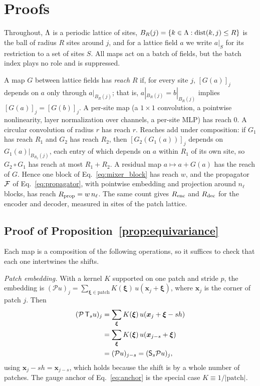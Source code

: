 \section{Proofs}
\label{app:proofs}

Throughout, $\Lambda$ is a periodic lattice of sites, $B_R(j)=\{k\in\Lambda:
\operatorname{dist}(k,j)\le R\}$ is the ball of radius $R$ sites around $j$, and for a
lattice field $a$ we write $a|_S$ for its restriction to a set of sites
$S$. All maps act on a batch of fields, but the batch index plays no role
and is suppressed.

A map $G$ between lattice fields has \emph{reach} $R$ if, for every site
$j$, $[G(a)]_j$ depends on $a$ only through $a|_{B_R(j)}$; that is,
$a|_{B_R(j)}=b|_{B_R(j)}$ implies $[G(a)]_j=[G(b)]_j$. A per-site map
(a $1\times1$ convolution, a pointwise nonlinearity, layer normalization
over channels, a per-site MLP) has reach $0$. A circular convolution of
radius $r$ has reach $r$. Reaches add under composition: if $G_1$ has
reach $R_1$ and $G_2$ has reach $R_2$, then $[G_2(G_1(a))]_j$ depends on
$G_1(a)|_{B_{R_2}(j)}$, each entry of which depends on $a$ within $R_1$
of its own site, so $G_2\circ G_1$ has reach at most $R_1+R_2$. A residual
map $a\mapsto a+G(a)$ has the reach of $G$. Hence one block of
Eq.~\eqref{eq:mixer_block} has reach $w$, and the propagator $\mathcal{F}$ of
Eq.~\eqref{eq:propagator}, with pointwise embedding and projection around
$n_\ell$ blocks, has reach $R_{\mathrm{prop}} = w\,n_\ell$. The same count gives
$R_{\mathrm{enc}}$ and $R_{\mathrm{dec}}$ for the encoder and decoder, measured in sites of
the patch lattice.

\subsection{Proof of Proposition~\ref{prop:equivariance}}

Each map is a composition of the following operations, so it suffices to
check that each one intertwines the shifts.

\emph{Patch embedding.} With a kernel $K$ supported on one patch and
stride $p$, the embedding is $(\mathcal{P}u)_j =
\sum_{\bm{\xi}\in\text{patch}}K(\bm{\xi})\,u(\bm{x}_j+\bm{\xi})$, where
$\bm{x}_j$ is the corner of patch $j$. Then
\[
\begin{aligned}
  (\mathcal{P}\,\mathsf{T}_{s}u)_j
  &= \sum_{\bm{\xi}}K(\bm{\xi})\,u(\bm{x}_j+\bm{\xi}-s h)\\
  &= \sum_{\bm{\xi}}K(\bm{\xi})\,u(\bm{x}_{j-s}+\bm{\xi})\\
  &= (\mathcal{P}u)_{j-s}
  = (\mathsf{S}_s\mathcal{P}u)_j,
\end{aligned}
\]
using $\bm{x}_j - sh = \bm{x}_{j-s}$, which holds because the shift is by
a whole number of patches. The gauge anchor of Eq.~\eqref{eq:anchor} is
the special case $K\equiv1/|\text{patch}|$.

